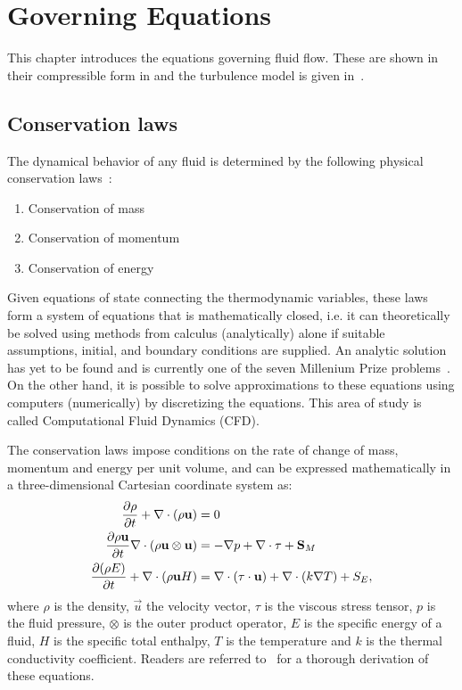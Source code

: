\chapter{Governing Equations}
\label{chap:governing}
This chapter introduces the  equations governing fluid flow.
These are shown in their compressible form in  and
the turbulence model is given in~.
\section{Conservation laws}
\label{sec:ns}
The dynamical behavior of any fluid is determined by the following physical conservation laws~\cite{blazek2015computational}:
\begin{enumerate}
    \item Conservation of mass
    \item Conservation of momentum
    \item Conservation of energy
\end{enumerate}
Given equations of state connecting the thermodynamic variables, these laws form a system of equations that is mathematically closed, i.e. it can theoretically be solved using methods from calculus (analytically) alone if suitable assumptions, initial, and boundary conditions are supplied. An analytic solution has yet to be found and is currently one of the seven Millenium Prize problems~\cite{carlson2006millennium}. On the other hand, it is possible to solve approximations to these equations using computers (numerically) by discretizing the equations. This area of study is called Computational Fluid Dynamics (CFD).

The conservation laws impose conditions on the rate of change of mass, momentum and energy per unit volume, and can be expressed mathematically in a three-dimensional Cartesian coordinate system as:
\begin{align}
     \frac{\partial \rho}{\partial t}  + \nabla \cdot
        (\rho\mathbf{u}) &= 0 \label{eq:mass}
    \\
     \frac{\partial \rho\mathbf{u}}{\partial t}  \nabla\cdot(\rho\mathbf{u}\otimes\mathbf{u}) &= -\nabla p
     + \nabla \cdot \tau
     + \mathbf{S}_{M}
     \label{eq:mom}
     \\
     \frac{\partial (\rho E)}{\partial t}  + \nabla\cdot(\rho\mathbf{u}H) &=
      \nabla\cdot(\tau\cdot\mathbf{u}) + \nabla\cdot(k\nabla T)
         + S_E
     \label{eq:energy},
\end{align}
where $\rho$ is the density, $\vec{u}$ the velocity vector, $\tau$ is the viscous stress tensor, $p$ is the fluid pressure, $\otimes$ is the outer product operator, $E$ is the specific energy of a fluid, $H$ is the specific total enthalpy, $T$ is the temperature and $k$ is the thermal conductivity coefficient. Readers are referred to~\cite{munson2012fundamentals} for a thorough derivation of these equations.

